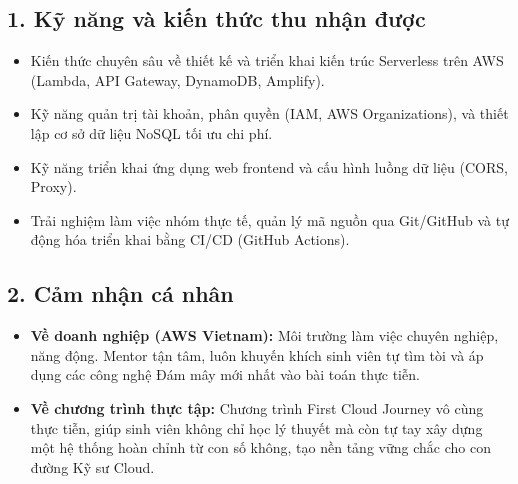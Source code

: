 \documentclass[a4paper]{article}
\theoremstyle{definition}
\begin{document}
\subsection*{1. Kỹ năng và kiến thức thu nhận được}
\begin{itemize}
    \item Kiến thức chuyên sâu về thiết kế và triển khai kiến trúc Serverless trên AWS (Lambda, API Gateway, DynamoDB, Amplify).
    \item Kỹ năng quản trị tài khoản, phân quyền (IAM, AWS Organizations), và thiết lập cơ sở dữ liệu NoSQL tối ưu chi phí.
    \item Kỹ năng triển khai ứng dụng web frontend và cấu hình luồng dữ liệu (CORS, Proxy).
    \item Trải nghiệm làm việc nhóm thực tế, quản lý mã nguồn qua Git/GitHub và tự động hóa triển khai bằng CI/CD (GitHub Actions).
\end{itemize}

\subsection*{2. Cảm nhận cá nhân}
\begin{itemize}
    \item \textbf{Về doanh nghiệp (AWS Vietnam):} Môi trường làm việc chuyên nghiệp, năng động. Mentor tận tâm, luôn khuyến khích sinh viên tự tìm tòi và áp dụng các công nghệ Đám mây mới nhất vào bài toán thực tiễn.
    \item \textbf{Về chương trình thực tập:} Chương trình First Cloud Journey vô cùng thực tiễn, giúp sinh viên không chỉ học lý thuyết mà còn tự tay xây dựng một hệ thống hoàn chỉnh từ con số không, tạo nền tảng vững chắc cho con đường Kỹ sư Cloud.
\end{itemize}

\end{document}
